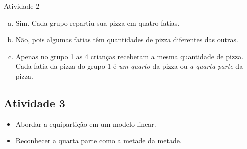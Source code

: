 \begin{multicols}{2}
\begin{resposta*}{Atividade 2}
\begin{enumerate} [a),wide,labelindent=0pt] %
    \item       Sim. Cada grupo repartiu sua pizza em quatro fatias.
    \item       Não, pois algumas fatias têm quantidades de pizza diferentes das outras.
    \item       Apenas no grupo 1 as 4 crianças receberam a mesma quantidade de pizza. Cada fatia da pizza do grupo 1 é {\it um quarto} da pizza ou {\it a quarta parte} da pizza.
\end{enumerate} %
\end{resposta*}



\subsection{Atividade 3}
  \vspace{.1cm}

\begin{itemize} %
    \item       Abordar a equipartição em um modelo linear.
    \item       Reconhecer a quarta parte como a metade da metade.
\end{itemize} %
 \vspace{.1cm}

   \vspace{.1cm}


\end{multicols}
